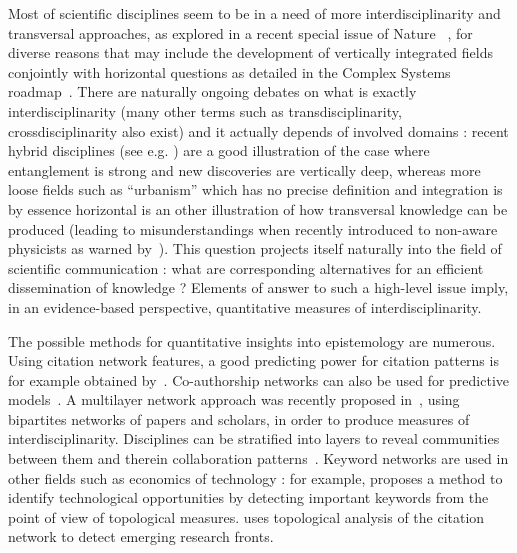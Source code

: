 Most of scientific disciplines seem to be in a need of more interdisciplinarity and transversal approaches, as explored in a recent special issue of Nature~\cite{} %
, for diverse reasons that may include the development of vertically integrated fields conjointly with horizontal questions as detailed in the Complex Systems roadmap~\cite{2009arXiv0907.2221B}. There are naturally ongoing debates on what is exactly interdisciplinarity (many other terms such as transdisciplinarity, crossdisciplinarity also exist) and it actually depends of involved domains : recent hybrid disciplines (see e.g. )%
are a good illustration of the case where entanglement is strong and new discoveries are vertically deep, whereas %
more loose fields such as ``urbanism'' which has no precise definition and integration is by essence horizontal is an other illustration of how transversal knowledge can be produced (leading to misunderstandings when recently introduced to non-aware physicists as warned by~\cite{dupuy2015sciences}).
This question projects itself naturally into the field of scientific communication : what are corresponding alternatives for an efficient dissemination of knowledge ? Elements of answer to such a high-level issue imply, in an evidence-based perspective, quantitative measures of interdisciplinarity.




The possible methods for quantitative insights into epistemology are numerous. %
 Using citation network features, a good predicting power for citation patterns is for example obtained by~\cite{2013arXiv1310.8220N}. Co-authorship networks can also be used for predictive models~\cite{2014arXiv1402.7268S}. A multilayer network approach was recently proposed in~\cite{2016arXiv160106075O}, using bipartites networks of papers and scholars, in order to produce measures of interdisciplinarity. Disciplines can be stratified into layers to reveal communities between them and therein collaboration patterns~\cite{2015arXiv150601280B}. Keyword networks are used in other fields such as economics of technology : for example, \cite{choi2014patent} proposes a method to identify technological opportunities by detecting important keywords from the point of view of topological measures. \cite{shibata2008detecting} uses topological analysis of the citation network to detect emerging research fronts.

